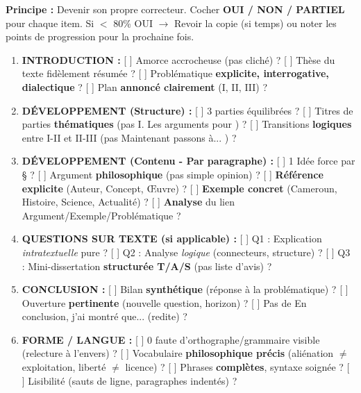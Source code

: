 \documentclass[11pt]{article}
\newcommand{\cle}[1]{{\popxbold\color{popdark}#1}}
\begin{document}
\begin{methode}
\textbf{Principe :} Devenir son propre correcteur. Cocher \textbf{OUI / NON / PARTIEL} pour chaque item. Si $<$ 80\% OUI $\rightarrow$ Revoir la copie (si temps) ou noter les points de progression pour la prochaine fois.
\begin{enumerate}
    \item \textbf{INTRODUCTION :} [ ] Amorce accrocheuse (pas cliché) ? [ ] Thèse du texte fidèlement résumée ? [ ] Problématique \textbf{explicite, interrogative, dialectique} ? [ ] Plan \textbf{annoncé clairement} (I, II, III) ?
    \item \textbf{DÉVELOPPEMENT (Structure) :} [ ] 3 parties équilibrées ? [ ] Titres de parties \textbf{thématiques} (pas \og I. Les arguments pour \fg) ? [ ] Transitions \textbf{logiques} entre I-II et II-III (pas \og Maintenant passons à... \fg) ?
    \item \textbf{DÉVELOPPEMENT (Contenu - Par paragraphe) :} [ ] 1 Idée force par § ? [ ] Argument \textbf{philosophique} (pas simple opinion) ? [ ] \textbf{Référence explicite} (Auteur, Concept, Œuvre) ? [ ] \textbf{Exemple concret} (Cameroun, Histoire, Science, Actualité) ? [ ] \textbf{Analyse} du lien Argument/Exemple/Problématique ?
    \item \textbf{QUESTIONS SUR TEXTE (si applicable) :} [ ] Q1 : Explication \emph{intratextuelle} pure ? [ ] Q2 : Analyse \emph{logique} (connecteurs, structure) ? [ ] Q3 : Mini-dissertation \textbf{structurée T/A/S} (pas liste d'avis) ?
    \item \textbf{CONCLUSION :} [ ] Bilan \textbf{synthétique} (réponse à la problématique) ? [ ] Ouverture \textbf{pertinente} (nouvelle question, horizon) ? [ ] Pas de \og En conclusion, j'ai montré que... \fg (redite) ?
    \item \textbf{FORME / LANGUE :} [ ] 0 faute d'orthographe/grammaire visible (relecture à l'envers) ? [ ] Vocabulaire \textbf{philosophique précis} (\cle{aliénation} $\neq$ \cle{exploitation}, \cle{liberté} $\neq$ \cle{licence}) ? [ ] Phrases \textbf{complètes}, syntaxe soignée ? [ ] Lisibilité (sauts de ligne, paragraphes indentés) ?
\end{enumerate}
\end{methode}
\end{document}
